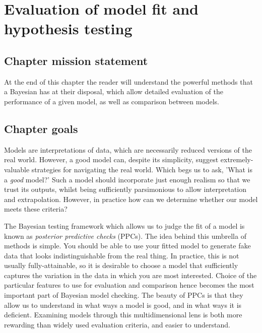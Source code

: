 \documentclass[11pt,fullpage]{book}
\begin{document}
\chapter{Evaluation of model fit and hypothesis testing}\label{chap:ModelFit}
\section{Chapter mission statement}
At the end of this chapter the reader will understand the powerful methods that a Bayesian has at their disposal, which allow detailed evaluation of the performance of a given model, as well as comparison between models.

\section{Chapter goals}
Models are interpretations of data, which are necessarily reduced versions of the real world. However, a good model can, despite its simplicity, suggest extremely-valuable strategies for navigating the real world. Which begs us to ask, 'What is a \textit{good} model?' Such a model should incorporate just enough realism so that we trust its outputs, whilst being sufficiently parsimonious to allow interpretation and extrapolation. However, in practice how can we determine whether our model meets these criteria? 

The Bayesian testing framework which allows us to judge the fit of a model is known as \textit{posterior predictive checks} (PPCs). The idea behind this umbrella of methods is simple. You should be able to use your fitted model to generate fake data that looks indistinguishable from the real thing. In practice, this is not usually fully-attainable, so it is desirable to choose a model that sufficiently captures the variation in the data in which you are most interested. Choice of the particular features to use for evaluation and comparison hence becomes the most important part of Bayesian model checking. The beauty of PPCs is that they allow us to understand in what ways a model is good, and in what ways it is deficient. Examining models through this multidimensional lens is both more rewarding than widely used evaluation criteria, and easier to understand.
\end{document}
